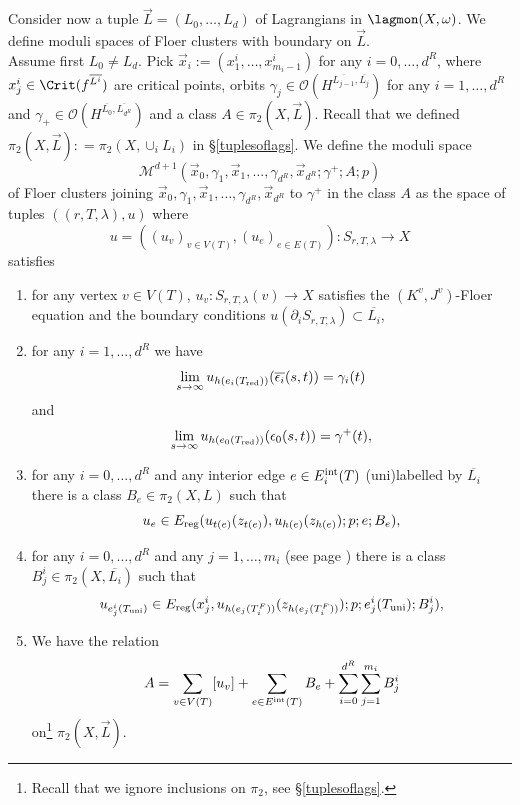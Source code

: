 Consider now a tuple $\vec{L}=(L_0,\ldots,L_d)$ of Lagrangians in $\lagmon(X,\omega)$. We define moduli spaces of Floer clusters with boundary on $\vec{L}$.\\
Assume first $L_0\neq L_d$. Pick $\vec{x}_i:=(x^i_1,\ldots,x^i_{m_i-1})$ for any $i=0,\ldots,d^R$, where $x^i_j\in \Crit(f^{\overline{L^i}})$ are critical points, orbits $\gamma_j\in \mathcal{O}(H^{\overline{L_{j-1}},\overline{L_j}})$ for any $i=1,\ldots,d^R$ and $\gamma_+\in \mathcal{O}(H^{\overline{L_0},\overline{L_{d^R}}})$ and a class $A\in \pi_2(X,\vec{L})$. Recall that we defined $\pi_2(X,\vec{L}): =\pi_2(X,\cup_i L_i)$ in \S \ref{tuplesoflags}.
We define the moduli space $$\mathcal{M}^{d+1}\left(\vec{x}_0, \gamma_1, \vec{x}_1,\ldots,\gamma_{d^R}, \vec{x}_{d^R}; \gamma^+;A;p\right)$$ of Floer clusters joining $\vec{x}_0, \gamma_1, \vec{x}_1,\ldots,\gamma_{d^R}, \vec{x}_{d^R}$ to $\gamma^+$ in the class $A$ as the space of tuples $((r,T,\lambda),u)$ where $$u=\left((u_v)_{v\in V(T)}, (u_e)_{e\in E(T)}\right): S_{r,T,\lambda}\to X$$ satisfies \begin{enumerate}
	\item for any vertex $v\in V(T)$, $u_v:S_{r,T,\lambda}(v)\to X$ satisfies the $(K^v,J^v)$-Floer equation and the boundary conditions $u(\partial_iS_{r,T,\lambda})\subset \overline{L_i}$,
	\item for any $i=1,\ldots,d^R$ we have $$\lim_{s\to \-\infty}u_{h(e_i(T_\textnormal{red}))}(\overline{\epsilon_i}(s,t))=\gamma_i(t)$$ and $$\lim_{s\to \infty}u_{h(e_0(T_\textnormal{red}))}(\epsilon_0(s,t))=\gamma^+(t),$$
	\item for any $i=0,\ldots,d^R$ and any interior edge $e\in E_i^\textnormal{int}(T)$ (uni)labelled by $\overline{L_i}$ there is a class $B_e\in \pi_2(X,L)$ such that $$u_e\in E_\textnormal{reg}(u_{t(e)}(z_{t(e)}), u_{h(e)}(z_{h(e)});p;e;B_e),$$
	\item for any $i=0,\ldots,d^R$ and any $j=1,\ldots,m_i$ (see page \pageref{defofmis}) there is a class $B_j^i\in \pi_2(X,\overline{L_i})$ such that $$u_{e^i_j(T_\textnormal{uni})}\in E_\textnormal{reg}(x^i_{j}, u_{h(e_j(T_i^F))}(z_{h(e_j(T_i^F))});p;e^i_j(T_\textnormal{uni});B_j^i),$$
	\item We have the relation $$A=\sum_{v\in V(T)}[u_v]+\sum_{e\in E^\textnormal{int}(T)}B_e+\sum_{i=0}^{d^R}\sum_{j=1}^{m_i}B_j^i$$ on\footnote{Recall that we ignore inclusions on $\pi_2$, see \S \ref{tuplesoflags}.} $\pi_2(X,\vec{L})$.
\end{enumerate}

